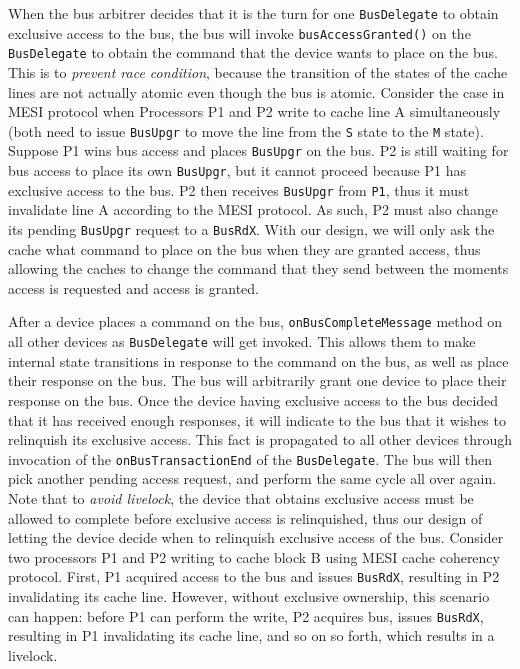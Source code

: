 \documentclass[nonacm,acmsmall,screen,11pt]{acmart}
\begin{document}
When the bus arbitrer decides that it is the turn for one \texttt{BusDelegate} to obtain exclusive access to the bus, the bus will invoke \texttt{busAccessGranted()} on the \texttt{BusDelegate} to obtain the command that the device wants to place on the bus.
This is to \emph{prevent race condition}, because the transition of the states of the cache lines are not actually atomic even though the bus is atomic.
Consider the case in MESI protocol when Processors P1 and P2 write to cache line A simultaneously (both need to issue \texttt{BusUpgr} to move the line from the \texttt{S} state to the \texttt{M} state). Suppose P1 wins bus access and places \texttt{BusUpgr} on the bus.
P2 is still waiting for bus access to place its own \texttt{BusUpgr}, but it cannot proceed because P1 has exclusive access to the bus.
P2 then receives \texttt{BusUpgr} from \texttt{P1}, thus it must invalidate line A according to the MESI protocol.
As such, P2 must also change its pending \texttt{BusUpgr} request to a \texttt{BusRdX}.
With our design, we will only ask the cache what command to place on the bus when they are granted access, thus allowing the caches to change the command that they send between the moments access is requested and access is granted.

After a device places a command on the bus, \texttt{onBusCompleteMessage} method on all other devices as \texttt{BusDelegate} will get invoked.
This allows them to make internal state transitions in response to the command on the bus, as well as place their response on the bus.
The bus will arbitrarily grant one device to place their response on the bus.
Once the device having exclusive access to the bus decided that it has received enough responses, it will indicate to the bus that it wishes to relinquish its exclusive access.
This fact is propagated to all other devices through invocation of the \texttt{onBusTransactionEnd} of the \texttt{BusDelegate}.
The bus will then pick another pending access request, and perform the same cycle all over again.
Note that to \emph{avoid livelock}, the device that obtains exclusive access must be allowed to complete before exclusive access is relinquished, thus our design of letting the device decide when to relinquish exclusive access of the bus.
Consider two processors P1 and P2 writing to cache block B using MESI cache coherency protocol.
First, P1 acquired access to the bus and issues \texttt{BusRdX}, resulting in P2 invalidating its cache line.
However, without exclusive ownership, this scenario can happen: before P1 can perform the write, P2 acquires bus, issues \texttt{BusRdX}, resulting in P1 invalidating its cache line, and so on so forth, which results in a livelock.
\end{document}
